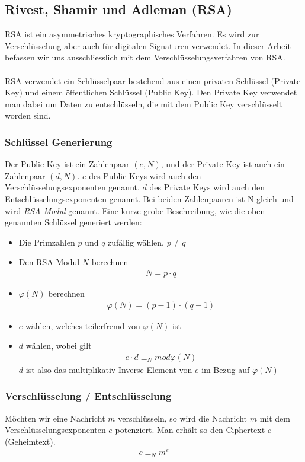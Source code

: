\documentclass[paper=a4,fontsize=12pt]{scrartcl}
\begin{document}
\subsection{Rivest, Shamir und Adleman (RSA)} \label{RSA-intro}
RSA ist ein asymmetrisches kryptographisches Verfahren. Es wird zur Verschlüsselung aber auch für digitalen Signaturen verwendet.
In dieser Arbeit befassen wir uns ausschliesslich mit dem Verschlüsselungsverfahren von RSA.
\\ \\
RSA verwendet ein Schlüsselpaar bestehend aus einen privaten Schlüssel (Private Key) und einem öffentlichen Schlüssel  (Public Key).
Den Private Key verwendet man dabei um Daten zu entschlüsseln, die mit dem Public Key verschlüsselt worden sind. 

\subsubsection{Schlüssel Generierung}
Der Public Key ist ein Zahlenpaar $(e,N)$, und der Private Key ist auch ein Zahlenpaar $(d,N)$.
$e$ des Public Keys wird auch den Verschlüsselungsexponenten genannt.
$d$ des Private Keys wird auch den Entschlüsselungsexponenten genannt. 
Bei beiden Zahlenpaaren ist N gleich und wird \textit{RSA Modul} genannt.
Eine kurze grobe Beschreibung, wie die oben genannten Schlüssel generiert werden:
\begin{itemize}
  \item Die Primzahlen $p$ und $q$ zufällig wählen, $p \neq q$
  \item Den RSA-Modul $N$ berechnen \begin{align} N = p \cdot q \end{align}
  \item $\varphi(N)$ berechnen \begin{align} \varphi(N) = (p-1) \cdot (q-1)\end{align}
  \item $e$ wählen, welches teilerfremd von $\varphi(N)$ ist
  \item $d$ wählen, wobei gilt \begin{align} e \cdot d \equiv_N mod \varphi(N)\end{align} $d$ ist also das multiplikativ Inverse Element von $e$ im Bezug auf $\varphi(N)$
\end{itemize}

\subsubsection{Verschlüsselung / Entschlüsselung}
Möchten wir eine Nachricht $m$ verschlüsseln, so wird die Nachricht $m$ mit dem Verschlüsselungsexponenten $e$ potenziert.
Man erhält so den Ciphertext $c$ (Geheimtext).
\begin{align}
	c \equiv_N m^e
\end{align}
\end{document}
